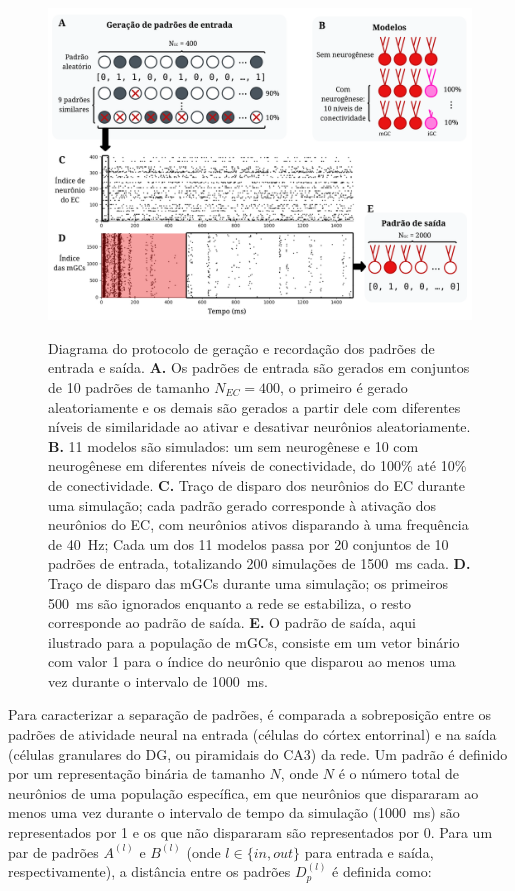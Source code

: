 \begin{figure}[H]
    \centering
    \caption{Diagrama do protocolo de geração e recordação dos padrões de entrada e saída.
    \textbf{A.} Os padrões de entrada são gerados em conjuntos de 10 padrões de tamanho $N_{EC} = 400$, o primeiro é gerado
    aleatoriamente e os demais são gerados a partir dele com diferentes níveis de similaridade ao ativar e desativar neurônios
    aleatoriamente.
    \textbf{B.} 11 modelos são simulados: um sem neurogênese e 10 com neurogênese em diferentes níveis de conectividade, do 100\%
    até 10\% de conectividade.
    \textbf{C.} Traço de disparo dos neurônios do EC durante uma simulação; cada padrão gerado corresponde à ativação dos neurônios
    do EC, com neurônios ativos disparando à uma frequência de \SI{40}{\hertz}; Cada um dos 11 modelos passa por 20 conjuntos de
    10 padrões de entrada, totalizando 200 simulações de \SI{1500}{\milli\second} cada.
    \textbf{D.} Traço de disparo das mGCs durante uma simulação; os primeiros \SI{500}{\milli\second} são ignorados enquanto a rede
    se estabiliza, o resto corresponde ao padrão de saída.
    \textbf{E.} O padrão de saída, aqui ilustrado para a população de mGCs, consiste em um vetor binário com valor 1 para o índice
    do neurônio que disparou ao menos uma vez durante o intervalo de \SI{1000}{\milli\second}.}
    \includegraphics[width=\textwidth]{figuras/diagrama_entrada_saida}
    \label{fig:diagrama_entrada_saida}
\end{figure}

Para caracterizar a separação de padrões, é comparada a sobreposição entre os padrões de atividade neural na entrada (células do
córtex entorrinal) e na saída (células granulares do DG, ou piramidais do CA3) da rede. Um padrão é definido por um representação
binária de tamanho $N$, onde $N$ é o número total de neurônios de uma população específica, em que neurônios que dispararam ao
menos uma vez durante o intervalo de tempo da simulação (\SI{1000}{\milli\second}) são representados por 1 e os que não dispararam
são representados por 0. Para um par de padrões $A^{(l)}$ e $B^{(l)}$ (onde $l \in \{in, out\}$ para entrada e saída,
respectivamente), a distância entre os padrões $D_p^{(l)}$ é definida como:


